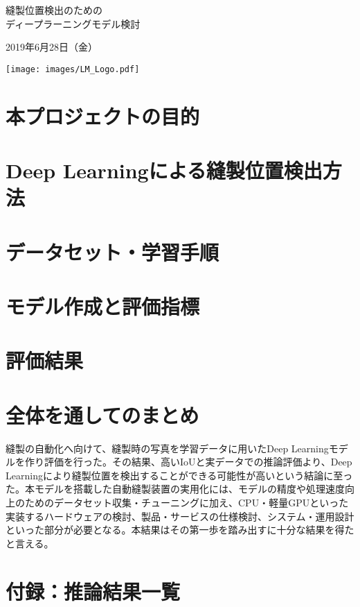 \documentclass[dvipdfmx,autodetect-engine,10pt,a4paper]{jsarticle}
\begin{document}

\begin{center}
  \vspace*{20mm}
  \Huge 縫製位置検出のための\\
 \Huge ディープラーニングモデル検討 \par
  \vspace{10mm}
  \huge 2019年6月28日（金） \par
  \vspace{90mm}
  \texttt{[image: images/LM\_Logo.pdf]}
  \thispagestyle{empty}
  \clearpage
  \addtocounter{page}{-1}
  \end{center}
\newpage

\tableofcontents
\thispagestyle{empty}
\clearpage
\addtocounter{page}{-1}
\clearpage

\section{本プロジェクトの目的}


\clearpage
\section{Deep Learningによる縫製位置検出方法}


\clearpage
\section{データセット・学習手順}


\clearpage
\section{モデル作成と評価指標}


\clearpage
\section{評価結果}



\clearpage
\section{全体を通してのまとめ}

縫製の自動化へ向けて、縫製時の写真を学習データに用いたDeep Learningモデルを作り評価を行った。その結果、高いIoUと実データでの推論評価より、Deep Learningにより縫製位置を検出することができる可能性が高いという結論に至った。本モデルを搭載した自動縫製装置の実用化には、モデルの精度や処理速度向上のためのデータセット収集・チューニングに加え、CPU・軽量GPUといった実装するハードウェアの検討、製品・サービスの仕様検討、システム・運用設計といった部分が必要となる。本結果はその第一歩を踏み出すに十分な結果を得たと言える。

\clearpage
\section *{付録：推論結果一覧}





\end{document}
